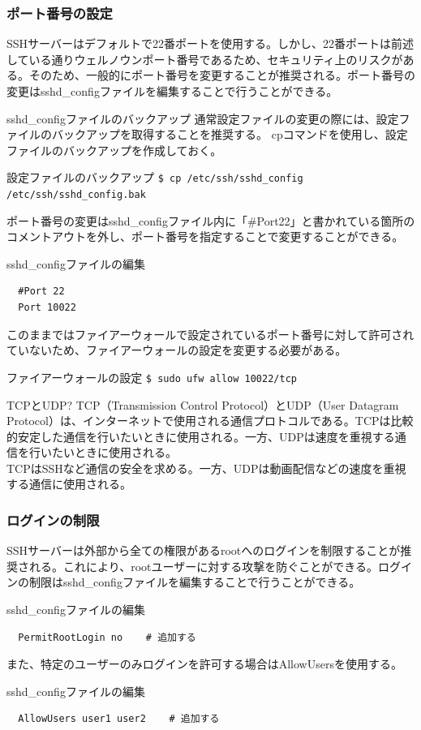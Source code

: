 \documentclass[a4paper, 11pt, dvipdfmx]{jsarticle}
\begin{document}
\subsubsection{ポート番号の設定}
SSHサーバーはデフォルトで22番ポートを使用する。しかし、22番ポートは前述している通りウェルノウンポート番号であるため、セキュリティ上のリスクがある。そのため、一般的にポート番号を変更することが推奨される。ポート番号の変更はsshd\_configファイルを編集することで行うことができる。
\begin{attentionbox}{sshd\_configファイルのバックアップ}
  通常設定ファイルの変更の際には、設定ファイルのバックアップを取得することを推奨する。
  cpコマンドを使用し、設定ファイルのバックアップを作成しておく。
  \begin{commandbox}{設定ファイルのバックアップ}
    \verb|$ cp /etc/ssh/sshd_config /etc/ssh/sshd_config.bak|
  \end{commandbox}
\end{attentionbox}
ポート番号の変更はsshd\_configファイル内に「\#Port22」と書かれている箇所のコメントアウトを外し、ポート番号を指定することで変更することができる。
\begin{commandbox}{sshd\_configファイルの編集}
  \begin{verbatim}
  #Port 22
  Port 10022\end{verbatim}
\end{commandbox}
このままではファイアーウォールで設定されているポート番号に対して許可されていないため、ファイアーウォールの設定を変更する必要がある。
\begin{commandbox}{ファイアーウォールの設定}
  \verb|$ sudo ufw allow 10022/tcp|
\end{commandbox}
\begin{johobox}{TCPとUDP?}
  TCP（Transmission Control Protocol）とUDP（User Datagram Protocol）は、インターネットで使用される通信プロトコルである。TCPは比較的安定した通信を行いたいときに使用される。一方、UDPは速度を重視する通信を行いたいときに使用される。\\
  TCPはSSHなど通信の安全を求める。一方、UDPは動画配信などの速度を重視する通信に使用される。
\end{johobox}
\subsubsection{ログインの制限}
SSHサーバーは外部から全ての権限があるrootへのログインを制限することが推奨される。これにより、rootユーザーに対する攻撃を防ぐことができる。ログインの制限はsshd\_configファイルを編集することで行うことができる。
\begin{commandbox}{sshd\_configファイルの編集}
  \begin{verbatim}
  PermitRootLogin no    # 追加する\end{verbatim}
\end{commandbox}
また、特定のユーザーのみログインを許可する場合はAllowUsersを使用する。
\begin{commandbox}{sshd\_configファイルの編集}
  \begin{verbatim}
  AllowUsers user1 user2    # 追加する\end{verbatim}
\end{commandbox}
\end{document}
